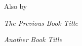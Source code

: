 \thispagestyle{empty}
\vspace*{2in}
\begin{center}
    {\large Also by \authorname}
    \vspace{1in}

    {\itshape The Previous Book Title}

    {\itshape Another Book Title}
\end{center}
\cleardoublepage
